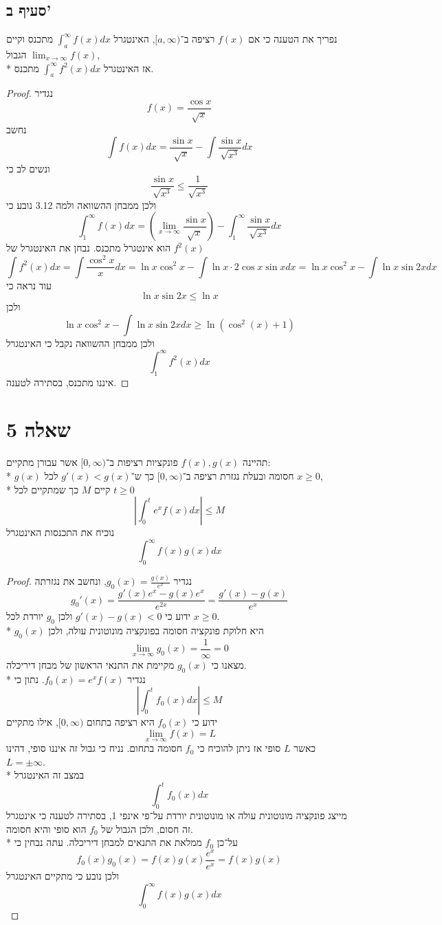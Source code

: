 \subsection{סעיף ב'}
נפריך את הטענה כי
אם $f(x)$ רציפה ב־$[a, \infty)$, האינטגרל $\displaystyle\int_a^\infty f(x) dx$ מתכנס וקיים הגבול $\displaystyle\lim_{x \to \infty} f(x)$, \\* %
אז האינטגרל $\displaystyle\int_a^\infty f^2(x) dx$ מתכנס.
\begin{proof}
	נגדיר
	\[
		f(x) = \frac{\cos x}{\sqrt{x}}
	\]
	נחשב
	\[
		\int f(x) dx = \frac{\sin x}{\sqrt{x}} - \int \frac{\sin x}{\sqrt{x^3}} dx
	\]
	ונשים לב כי
	\[
		\frac{\sin x}{\sqrt{x^3}} \le \frac{1}{\sqrt{x^3}}
	\]
	ולכן ממבחן ההשוואה ולמה 3.12 נובע כי
	\[
		\int_1^\infty f(x) dx = \left( \lim_{x \to \infty} \frac{\sin x}{\sqrt{x}} \right) - \int_1^\infty \frac{\sin x}{\sqrt{x^3}} dx
	\]
	הוא אינטגרל מתכנס. נבחן את האינטגרל של $f^2(x)$
	\[
		\int f^2(x) dx
		= \int \frac{\cos^2 x}{x} dx
		= \ln x \cos^2 x - \int \ln x \cdot 2 \cos x \sin x dx
		= \ln x \cos^2 x - \int \ln x \sin 2x dx
	\]
	עוד נראה כי
	\[
		\ln x \sin 2x \le \ln x
	\]
	ולכן
	\[
		\ln x \cos^2 x - \int \ln x \sin 2x dx \ge \ln (\cos^2(x) + 1)
	\]
	ולכן ממבחן ההשוואה נקבל כי האינטגרל
	\[
		\int_1^\infty f^2(x) dx
	\]
	איננו מתכנס, בסתירה לטענה.
\end{proof}

\section{שאלה 5}
תהיינה $f(x), g(x)$ פונקציות רציפות ב־$[0, \infty)$ אשר עבורן מתקיים: \\* %
$g(x)$ חסומה ובעלת נגזרת רציפה ב־$[0, \infty)$ כך ש־$g'(x) < g(x)$ לכל $x \ge 0$, \\* %
קיים $M$ כך שמתקיים לכל $t \ge 0$
\[
	\left\lvert \int_0^t e^x f(x) dx \right\rvert \le M
\]
נוכיח את התכנסות האינטגרל
\[
	\int_0^\infty f(x) g(x) dx
\]
\begin{proof}
	נגדיר $g_0(x) = \frac{g(x)}{e^x}$, ונחשב את נגזרתה
	\[
		g_0'(x) = \frac{g'(x) e^x - g(x) e^x}{e^{2x}} = \frac{g'(x) - g(x)}{e^x}
	\]
	ידוע כי $g'(x) - g(x) < 0$ ולכן $g_0$ יורדת לכל $x \ge 0$. \\*
	$g_0(x)$ היא חלוקת פונקציה חסומה בפונקציה מונוטונית עולה, ולכן
	\[
		\lim_{x \to \infty} g_0(x) = \frac{1}{\infty} = 0
	\]
	מצאנו כי $g_0(x)$ מקיימת את התנאי הראשון של מבחן דיריכלה. \\*
	נגדיר $f_0(x) = e^x f(x)$. נתון כי
	\[
		\left\lvert \int_0^t f_0(x) dx \right\rvert \le M
	\]
	ידוע כי $f_0(x)$ היא רציפה בתחום $[0, \infty)$, אילו מתקיים %
	\[
		\lim_{x \to \infty} f(x) = L
	\]
	כאשר $L$ סופי אז ניתן להוכיח כי $f_0$ חסומה בתחום. נניח כי גבול זה איננו סופי, דהינו $L = \pm \infty$. \\*
	במצב זה האינטגרל
	\[
		\int_0^t f_0(x) dx
	\]
	מייצג פונקציה מונוטונית עולה או מונוטונית יורדת על־פי אינפי 1, בסתירה לטענה כי אינטגרל זה חסום, ולכן הגבול של $f_0$ הוא סופי והיא חסומה. \\*
	על־כן $f_0$ ממלאת את התנאים למבחן דיריכלה. עתה נבחין כי
	\[
		f_0(x) g_0(x) = f(x) g(x) \frac{e^x}{e^x} = f(x) g(x)
	\]
	ולכן נובע כי מתקיים האינטגרל
	\[
		\int_0^\infty f(x) g(x) dx
	\]
\end{proof}

